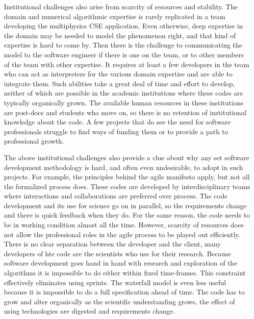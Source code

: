 
Institutional challenges also arise from scarcity of
resources and stability. The domain and numerical algorithmic
expertise is rarely replicated in a team developing the multiphysics
CSE application. Even otherwise, deep expertise in the domain may be
needed to model the phenomenon right, and that kind of expertise is
hard to come by. Then there is the challenge to communicating the
model to the software engineer if there is one on the team, or to
other members of the team with other expertise. It requires at least a
few developers in the team who can act as interpreters for the various
domain expertise and are able to integrate them. Such abilities take a
great deal of time and effort to develop, neither of which are
possible in the academic institutions where these codes are typically
organically grown. The available human resources in these institutions
are post-docs and students who move on, so there is no retention of
institutional knowledge about the code.  A few projects that do see
the need for software professionals struggle to find ways of funding
them or to provide a path to professional growth. 

The above institutional challenges also provide a clue about why any
set software development methodology is hard, and often even
undesirable, to adopt in such projects. For example, the principles
behind the agile manifesto apply, but not all the formalized process
does. These codes are developed by interdisciplinary teams where
interactions and collaborations are preferred over process. The code
development and its use for science go on in parallel, so the
requirements change and there is quick feedback when they do. For the
same reason, the code needs to be in working condition almost all the
time. However, scarcity of resources does not allow the professional roles in
the agile process to be played out efficiently.  There is no clear
separation between the developer and the client, many developers of
hte code are the scientists who use for their research. 
Because software development goes hand in hand with research and
exploration of the algorithms it is impossible to do either within
fixed time-frames. This constraint effectively eliminates using
sprints.  The waterfall model is even less useful because it is
impossible to do a full specification ahead of time. The code has to
grow and alter organically as the scientific understanding grows, the
effect of using technologies are digested and requirements change.


